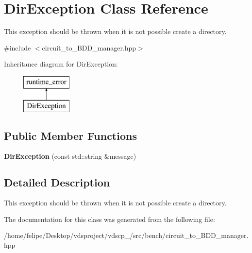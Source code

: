 \section{Dir\+Exception Class Reference}
\label{classDirException}


This exception should be thrown when it is not possible create a directory.  




{\ttfamily \#include $<$circuit\+\_\+to\+\_\+\+B\+D\+D\+\_\+manager.\+hpp$>$}

Inheritance diagram for Dir\+Exception\+:\begin{figure}[H]
\begin{center}
\leavevmode
\includegraphics[height=2.000000cm]{classDirException}
\end{center}
\end{figure}
\subsection*{Public Member Functions}
\begin{DoxyCompactItemize}
\item 
{\bfseries Dir\+Exception} (const std\+::string \&message)\label{classDirException_a33ced612aa6ea89e5cc843e20d5c54c3}

\end{DoxyCompactItemize}


\subsection{Detailed Description}
This exception should be thrown when it is not possible create a directory. 

The documentation for this class was generated from the following file\+:\begin{DoxyCompactItemize}
\item 
/home/felipe/\+Desktop/vdsproject/vdscp\+\_/src/bench/circuit\+\_\+to\+\_\+\+B\+D\+D\+\_\+manager.\+hpp\end{DoxyCompactItemize}
